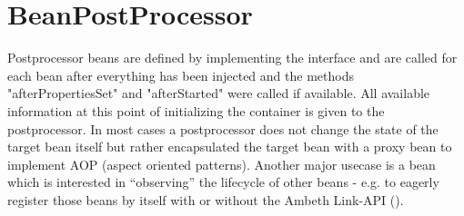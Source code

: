 \section{BeanPostProcessor}
\label{feature:BeanPostProcessor}
\ClearAPI
Postprocessor beans are defined by implementing the interface  and are called for each bean after everything has been injected and the methods "afterPropertiesSet" and "afterStarted" were called if available. All available information at this point of initializing the container is given to the postprocessor. In most cases a postprocessor does not change the state of the target bean itself but rather encapsulated the target bean with a proxy bean to implement AOP (aspect oriented patterns). Another major usecase is a bean which is interested in ``observing'' the lifecycle of other beans - e.g. to eagerly register those beans by itself with or without the Ambeth Link-API ().